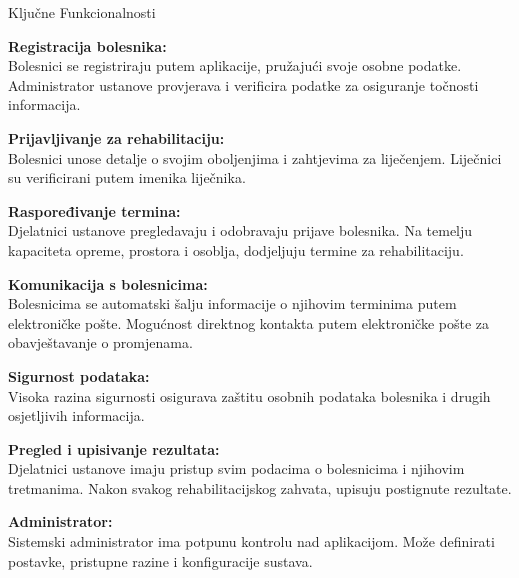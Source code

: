 \vspace{35pt}
\eject
\Large Ključne Funkcionalnosti \normalsize

\begin{packed_item}
	
	\item  \textbf{Registracija bolesnika:}\\
	Bolesnici se registriraju putem aplikacije, pružajući svoje osobne podatke.
	Administrator ustanove provjerava i verificira podatke za osiguranje točnosti informacija.
	
	\item  \textbf{Prijavljivanje za rehabilitaciju:}\\
	Bolesnici unose detalje o svojim oboljenjima i zahtjevima za liječenjem.
	Liječnici su verificirani putem imenika liječnika.
	
	\item  \textbf{Raspoređivanje termina:}\\
	Djelatnici ustanove pregledavaju i odobravaju prijave bolesnika.
	Na temelju kapaciteta opreme, prostora i osoblja, dodjeljuju termine za rehabilitaciju.
	
	\item  \textbf{Komunikacija s bolesnicima:}\\
	Bolesnicima se automatski šalju informacije o njihovim terminima putem elektroničke pošte.
	Mogućnost direktnog kontakta putem elektroničke pošte za obavještavanje o promjenama.
	
	\item  \textbf{Sigurnost podataka:}\\
	Visoka razina sigurnosti osigurava zaštitu osobnih podataka bolesnika i drugih osjetljivih informacija.
	
	\item  \textbf{Pregled i upisivanje rezultata:}\\
	Djelatnici ustanove imaju pristup svim podacima o bolesnicima i njihovim tretmanima.
	Nakon svakog rehabilitacijskog zahvata, upisuju postignute rezultate.
	
	\item  \textbf{Administrator:}\\
	Sistemski administrator ima potpunu kontrolu nad aplikacijom.
	Može definirati postavke, pristupne razine i konfiguracije sustava.
	
	
\end{packed_item}

\eject

